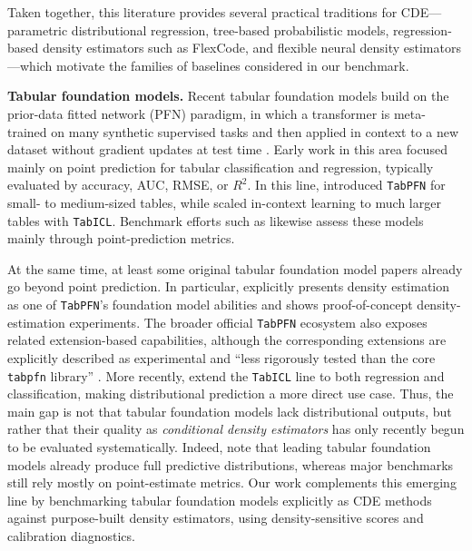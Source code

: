 \documentclass{article}
\newcommand{\method}[1]{\texttt{#1}}
\begin{document}
Taken together, this literature provides several practical traditions for CDE---parametric distributional regression, tree-based probabilistic models, regression-based density estimators such as FlexCode, and flexible neural density estimators---which motivate the families of baselines considered in our benchmark.

\textbf{Tabular foundation models.}
Recent tabular foundation models build on the prior-data fitted network (PFN) paradigm, in which a transformer is meta-trained on many synthetic supervised tasks and then applied in context to a new dataset without gradient updates at test time \citep{muller2022transformers,nagler2023statistical}. Early work in this area focused mainly on point prediction for tabular classification and regression, typically evaluated by accuracy, AUC, RMSE, or $R^2$. In this line, \citet{hollmann2025tabpfn} introduced \method{TabPFN} for small- to medium-sized tables, while \citet{qu2025tabicl} scaled in-context learning to much larger tables with \method{TabICL}. Benchmark efforts such as \citet{erickson2025tabarena} likewise assess these models mainly through point-prediction metrics.



At the same time, at least some original tabular foundation model papers already
go beyond point prediction. In particular, \citet{hollmann2025tabpfn}
explicitly presents density estimation as one of \method{TabPFN}'s foundation
model abilities and shows proof-of-concept density-estimation experiments.
The broader official \method{TabPFN} ecosystem also exposes related extension-based
capabilities, although the corresponding extensions are explicitly described as
experimental and ``less rigorously tested than the core \texttt{tabpfn}
library'' \citep{priorlabs2025tabpfnextensions}.
More recently, \citet{qu2026tabiclv2} extend the \method{TabICL} line to both
regression and classification, making distributional prediction a more direct
use case. Thus, the main gap is not that tabular foundation models lack
distributional outputs, but rather that their quality as \emph{conditional
density estimators} has only recently begun to be evaluated systematically.
Indeed, \citet{landsgesell2026distributional} note that leading tabular
foundation models already produce full predictive distributions, whereas major
benchmarks still rely mostly on point-estimate metrics. Our work complements
this emerging line by benchmarking tabular foundation models explicitly as CDE
methods against purpose-built density estimators, using density-sensitive scores
and calibration diagnostics.
\end{document}
